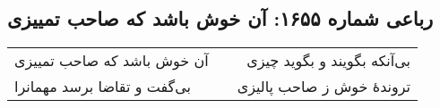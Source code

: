 \begin{center}
\section*{رباعی شماره ۱۶۵۵: آن خوش باشد که صاحب تمییزی}
\label{sec:1655}
\begin{longtable}{l p{0.5cm} r}
آن خوش باشد که صاحب تمییزی
&&
بی‌آنکه بگویند و بگوید چیزی
\\
بی‌گفت و تقاضا برسد مهمانرا
&&
تروندهٔ خوش ز صاحب پالیزی
\\
\end{longtable}
\end{center}

